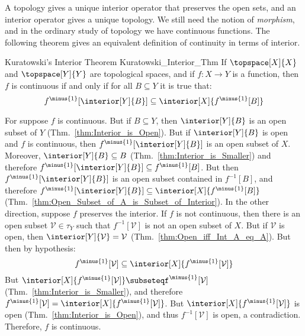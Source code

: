         A topology gives a unique interior operator that preserves the open
        sets, and an interior operator gives a unique topology. We still
        need the notion of \textit{morphism}, and in the ordinary study of
        topology we have continuous functions. The following theorem gives
        an equivalent definition of continuity in terms of interior.
        \begin{ftheorem}{Kuratowski's Interior Theorem}
                        {Kuratowski_Interior_Thm}
            If $\topspace[X]{X}$ and $\topspace[Y]{Y}$ are topological
            spaces, and if $f:X\rightarrow{Y}$ is a function, then $f$ is
            continuous if and only if for all $B\subseteq{Y}$ it is true
            that:
            \begin{equation*}
                f^{\minus{1}}[\interior[Y]{B}]\subseteq
                    \interior[X]{f^{\minus{1}}[B]}
            \end{equation*}
        \end{ftheorem}
        \begin{bproof}
            For suppose $f$ is continuous. But if $B\subseteq{Y}$, then
            $\interior[Y]{B}$ is an open subset of $Y$
            (Thm.~\ref{thm:Interior_is_Open}). But if $\interior[Y]{B}$ is
            open and $f$ is continuous, then
            $f^{\minus{1}}[\interior[Y]{B}]$ is an open subset of $X$.
            Moreover, $\interior[Y]{B}\subseteq{B}$
            (Thm.~\ref{thm:Interior_is_Smaller}) and therefore
            $f^{\minus{1}}[\interior[Y]{B}]\subseteq{f}^{\minus{1}}[B]$. But
            then $f^{\minus{1}}[\interior[Y]{B}]$ is an open subset
            contained in $f^{\minus{1}}[B]$, and therefore
            $f^{\minus{1}}[\interior[Y]{B}]\subseteq%
            \interior[X]{f^{\minus{1}}[B]}$
            (Thm.~\ref{thm:Open_Subset_of_A_is_Subset_of_Interior}). In the
            other direction, suppose $f$ preserves the interior. If $f$ is
            not continuous, then there is an open subset
            $\mathcal{V}\in\tau_{Y}$ such that $f^{\minus{1}}[\mathcal{V}]$
            is not an open subset of $X$. But if $\mathcal{V}$ is open, then
            $\interior[Y]{\mathcal{V}}=\mathcal{V}$
            (Thm.~\ref{thm:Open_iff_Int_A_eq_A}). But then by hypothesis:
            \begin{equation}
                f^{\minus{1}}[\mathcal{V}]\subseteq
                \interior[X]{f^{\minus{1}}[\mathcal{V}]}
            \end{equation}
            But $\interior[X]{f^{\minus{1}}[\mathcal{V}]}\subseteq%
            f^{\minus{1}}[\mathcal{V}]$
            (Thm.~\ref{thm:Interior_is_Smaller}), and therefore
            $f^{\minus{1}}[\mathcal{V}]=%
             \interior[X]{f^{\minus{1}}[\mathcal{V}]}$. But
            $\interior[X]{f^{\minus{1}}[\mathcal{V}]}$ is open
            (Thm.~\ref{thm:Interior_is_Open}), and thus
            $f^{\minus{1}}[\mathcal{V}]$ is open, a contradiction.
            Therefore, $f$ is continuous.
        \end{bproof}
